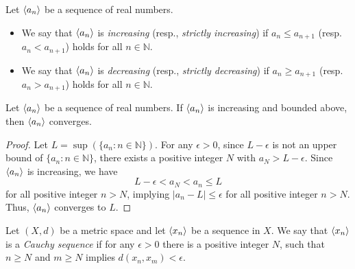 \begin{definition}
  Let $\left\langle a_n\right\rangle$ be a sequence of real numbers.
  \begin{itemize}
    \item We say that $\left\langle a_n\right\rangle$ is \emph{increasing} (resp., \emph{strictly
    increasing}) if $a_n \leq a_{n+1}$ (resp. $a_n < a_{n+1}$) holds for all
    $n \in \mathbb{N}$.
    \item We say that $\left\langle a_n\right\rangle$ is \emph{decreasing} (resp., \emph{strictly
    decreasing}) if $a_n \geq a_{n+1}$ (resp. $a_n > a_{n+1}$) holds for all
    $n \in \mathbb{N}$.
  \end{itemize}
\end{definition}

\begin{theorem}
  Let $\left\langle a_n\right\rangle$ be a sequence of real numbers.
  If $\left\langle a_n\right\rangle$ is increasing and bounded above, then $\left\langle a_n\right\rangle$ converges.
\end{theorem}
\begin{proof}
  Let $L = \sup(\{a_n: n \in \mathbb{N}\})$.
  For any $\epsilon > 0$, since $L - \epsilon$ is not an upper bound of
  $\{a_n: n \in \mathbb{N}\}$, there exists a positive integer $N$ with
  $a_N > L - \epsilon$.
  Since $\left\langle a_n\right\rangle$ is increasing, we have
  \begin{equation*}
    L - \epsilon < a_N < a_n \leq L
  \end{equation*}
  for all positive integer $n > N$, implying $|a_n - L| \leq \epsilon$ for all
  positive integer $n > N$.
  Thus, $\left\langle a_n\right\rangle$ converges to $L$.
\end{proof}

\begin{definition}
  Let $(X, d)$ be a metric space and let $\left\langle x_n\right\rangle$ be a sequence in $X$.
  We say that $\left\langle x_n\right\rangle$ is a \emph{Cauchy sequence} if for any $\epsilon > 0$
  there is a positive integer $N$, such that $n \geq N$ and $m \geq N$ implies
  $d(x_n, x_m) < \epsilon$.
\end{definition}
